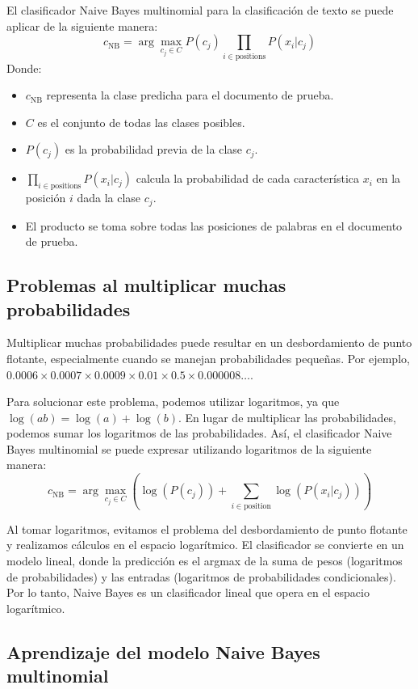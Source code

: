 El clasificador Naive Bayes multinomial para la clasificación de texto se puede aplicar de la siguiente manera:
\[
c_{\text{NB}} = \arg\max_{c_j \in C} P(c_j) \prod_{i \in \text{positions}} P(x_i | c_j)
\]
Donde:
\begin{itemize}
    \item $c_{\text{NB}}$ representa la clase predicha para el documento de prueba.
    \item $C$ es el conjunto de todas las clases posibles.
    \item $P(c_j)$ es la probabilidad previa de la clase $c_j$.
    \item $\prod_{i \in \text{positions}} P(x_i | c_j)$ calcula la probabilidad de cada característica $x_i$ en la posición $i$ dada la clase $c_j$.
    \item El producto se toma sobre todas las posiciones de palabras en el documento de prueba.
\end{itemize}

\subsection{Problemas al multiplicar muchas probabilidades}

Multiplicar muchas probabilidades puede resultar en un desbordamiento de punto flotante, especialmente cuando se manejan probabilidades pequeñas. Por ejemplo, $0.0006 \times 0.0007 \times 0.0009 \times 0.01 \times 0.5 \times 0.000008 \ldots$.

Para solucionar este problema, podemos utilizar logaritmos, ya que $\log(ab) = \log(a) + \log(b)$. En lugar de multiplicar las probabilidades, podemos sumar los logaritmos de las probabilidades. Así, el clasificador Naive Bayes multinomial se puede expresar utilizando logaritmos de la siguiente manera:
\[
c_{\text{NB}} = \arg\max_{c_j \in C} \left(\log(P(c_j)) + \sum_{i \in \text{position}} \log(P(x_i | c_j))\right)
\]

Al tomar logaritmos, evitamos el problema del desbordamiento de punto flotante y realizamos cálculos en el espacio logarítmico. El clasificador se convierte en un modelo lineal, donde la predicción es el argmax de la suma de pesos (logaritmos de probabilidades) y las entradas (logaritmos de probabilidades condicionales). Por lo tanto, Naive Bayes es un clasificador lineal que opera en el espacio logarítmico.

\subsection{Aprendizaje del modelo Naive Bayes multinomial}

